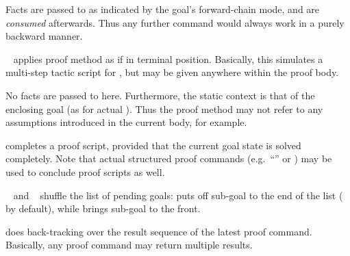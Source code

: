 \begin{isabellebody}
\begin{isamarkuptext}
\begin{descr}
  Facts are passed to  as indicated by the goal's
  forward-chain mode, and are \emph{consumed} afterwards.  Thus any
  further \hyperlink{command.apply}{\mbox{}} command would always work in a purely
  backward manner.
  
  \item [\hyperlink{command.apply-end}{\mbox{\isa{\isacommand{apply{\isacharunderscore}end}}}}~\isa{{\isachardoublequote}m{\isachardoublequote}}] applies proof method
   as if in terminal position.  Basically, this simulates a
  multi-step tactic script for \hyperlink{command.qed}{\mbox{}}, but may be given
  anywhere within the proof body.
  
  No facts are passed to  here.  Furthermore, the static
  context is that of the enclosing goal (as for actual \hyperlink{command.qed}{\mbox{}}).  Thus the proof method may not refer to any assumptions
  introduced in the current body, for example.
  
  \item [\hyperlink{command.done}{\mbox{\isa{\isacommand{done}}}}] completes a proof script, provided that
  the current goal state is solved completely.  Note that actual
  structured proof commands (e.g.\ ``\hyperlink{command.dot}{\mbox{\isa{\isacommand{{\isachardot}}}}}'' or \hyperlink{command.sorry}{\mbox{}}) may be used to conclude proof scripts as well.

  \item [\hyperlink{command.defer}{\mbox{\isa{\isacommand{defer}}}}~\isa{n} and \hyperlink{command.prefer}{\mbox{\isa{\isacommand{prefer}}}}~\isa{n}] shuffle the list of pending goals: \hyperlink{command.defer}{\mbox{}} puts off
  sub-goal  to the end of the list ( by
  default), while \hyperlink{command.prefer}{\mbox{}} brings sub-goal  to the
  front.
  
  \item [\hyperlink{command.back}{\mbox{\isa{\isacommand{back}}}}] does back-tracking over the result
  sequence of the latest proof command.  Basically, any proof command
  may return multiple results.
  
  \end{descr}


\end{isamarkuptext}
\end{isabellebody}

